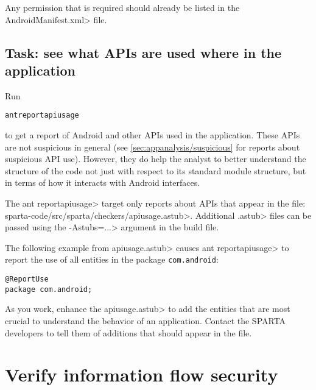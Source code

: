 Any permission that is required should already be listed in the
\<AndroidManifest.xml> file.





\subsection{Task: see what APIs are used where in the application}

Run

\begin{alltt}
  ant reportapiusage
\end{alltt}

\noindent
to get a report of Android and other APIs used in the application.
These APIs are not
suspicious in general (see \ref{sec:appanalysis/suspicious} for reports
about suspicious API use). However, they do help the analyst to better
understand the structure of the code not just with respect to its standard
module structure, but in terms of how it interacts with Android interfaces.

The
\<ant reportapiusage> target only reports about APIs that appear in the file:
\<sparta-code/src/sparta/checkers/apiusage.astub>.
Additional \<.astub> files can be passed using the \<-Astubs=...> argument in the
build file.

The following example from \<apiusage.astub> causes \<ant reportapiusage>
to report the use of all entities in the package 
\verb|com.android|:

\begin{Verbatim}
@ReportUse                                                         
package com.android;
\end{Verbatim}

As you work, enhance the \<apiusage.astub> to add the entities that are
most crucial to understand the behavior of an application.  Contact the
SPARTA developers to tell them of additions that should appear in the file.


\section{Verify information flow security\label{verify-information-flow-security}}

